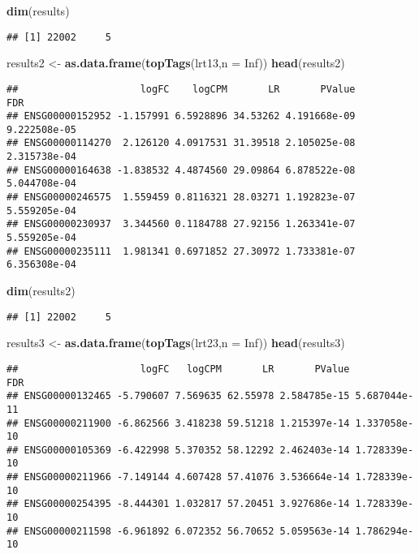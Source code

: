 \documentclass[
]{article}
\newenvironment{Shaded}{\begin{snugshade}}{\end{snugshade}}
\newcommand{\DataTypeTok}[1]{\textcolor[rgb]{0.13,0.29,0.53}{#1}}
\newcommand{\KeywordTok}[1]{\textcolor[rgb]{0.13,0.29,0.53}{\textbf{#1}}}
\newcommand{\NormalTok}[1]{#1}
\newcommand{\OtherTok}[1]{\textcolor[rgb]{0.56,0.35,0.01}{#1}}
\newcommand{\StringTok}[1]{\textcolor[rgb]{0.31,0.60,0.02}{#1}}
\begin{document}
\begin{Shaded}
\begin{Highlighting}[]
\KeywordTok{dim}\NormalTok{(results)}
\end{Highlighting}
\end{Shaded}

\begin{verbatim}
## [1] 22002     5
\end{verbatim}

\begin{Shaded}
\begin{Highlighting}[]
\NormalTok{results2 <-}\StringTok{ }\KeywordTok{as.data.frame}\NormalTok{(}\KeywordTok{topTags}\NormalTok{(lrt13,}\DataTypeTok{n =} \OtherTok{Inf}\NormalTok{))}
\KeywordTok{head}\NormalTok{(results2)}
\end{Highlighting}
\end{Shaded}

\begin{verbatim}
##                     logFC    logCPM       LR       PValue          FDR
## ENSG00000152952 -1.157991 6.5928896 34.53262 4.191668e-09 9.222508e-05
## ENSG00000114270  2.126120 4.0917531 31.39518 2.105025e-08 2.315738e-04
## ENSG00000164638 -1.838532 4.4874560 29.09864 6.878522e-08 5.044708e-04
## ENSG00000246575  1.559459 0.8116321 28.03271 1.192823e-07 5.559205e-04
## ENSG00000230937  3.344560 0.1184788 27.92156 1.263341e-07 5.559205e-04
## ENSG00000235111  1.981341 0.6971852 27.30972 1.733381e-07 6.356308e-04
\end{verbatim}

\begin{Shaded}
\begin{Highlighting}[]
\KeywordTok{dim}\NormalTok{(results2)}
\end{Highlighting}
\end{Shaded}

\begin{verbatim}
## [1] 22002     5
\end{verbatim}

\begin{Shaded}
\begin{Highlighting}[]
\NormalTok{results3 <-}\StringTok{ }\KeywordTok{as.data.frame}\NormalTok{(}\KeywordTok{topTags}\NormalTok{(lrt23,}\DataTypeTok{n =} \OtherTok{Inf}\NormalTok{))}
\KeywordTok{head}\NormalTok{(results3)}
\end{Highlighting}
\end{Shaded}

\begin{verbatim}
##                     logFC   logCPM       LR       PValue          FDR
## ENSG00000132465 -5.790607 7.569635 62.55978 2.584785e-15 5.687044e-11
## ENSG00000211900 -6.862566 3.418238 59.51218 1.215397e-14 1.337058e-10
## ENSG00000105369 -6.422998 5.370352 58.12292 2.462403e-14 1.728339e-10
## ENSG00000211966 -7.149144 4.607428 57.41076 3.536664e-14 1.728339e-10
## ENSG00000254395 -8.444301 1.032817 57.20451 3.927686e-14 1.728339e-10
## ENSG00000211598 -6.961892 6.072352 56.70652 5.059563e-14 1.786294e-10
\end{verbatim}
\end{document}
